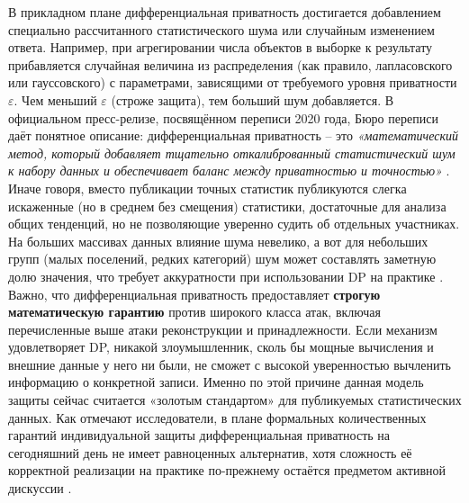 В прикладном плане дифференциальная приватность достигается
добавлением специально рассчитанного статистического шума или случайным изменением ответа. Например, при агрегировании
числа объектов в выборке к результату прибавляется случайная величина из распределения (как правило, лапласовского или
гауссовского) с параметрами, зависящими от требуемого уровня приватности $\varepsilon$. Чем меньший $\varepsilon$
(строже защита), тем больший шум добавляется. В официальном пресс-релизе, посвящённом переписи 2020 года, Бюро переписи
даёт понятное описание: дифференциальная приватность – это \textit{«математический метод, который добавляет тщательно
откалиброванный статистический шум к набору данных и обеспечивает баланс между приватностью и точностью»}
\autocite{census-gov}. Иначе говоря, вместо публикации точных статистик публикуются слегка искаженные (но в среднем без
смещения) статистики, достаточные для анализа общих тенденций, но не позволяющие уверенно судить об отдельных
участниках. На больших массивах данных влияние шума невелико, а вот для небольших групп (малых поселений, редких
категорий) шум может составлять заметную долю значения, что требует аккуратности при использовании DP на практике
\autocite{cornell-edu}. Важно, что дифференциальная приватность предоставляет \textbf{строгую математическую гарантию}
против широкого класса атак, включая перечисленные выше атаки реконструкции и принадлежности. Если механизм
удовлетворяет DP, никакой злоумышленник, сколь бы мощные вычисления и внешние данные у него ни были, не сможет с высокой
уверенностью вычленить информацию о конкретной записи. Именно по этой причине данная модель защиты сейчас считается
«золотым стандартом» для публикуемых статистических данных. Как отмечают исследователи, в плане
формальных количественных гарантий индивидуальной защиты дифференциальная приватность на сегодняшний день
не имеет равноценных альтернатив, хотя сложность её корректной реализации на практике по-прежнему остаётся
предметом активной дискуссии \autocite{cornell-edu}.

